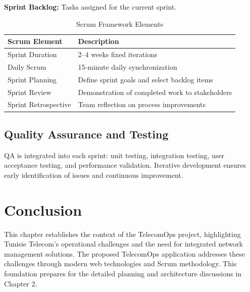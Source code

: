 \textbf{Sprint Backlog:} Tasks assigned for the current sprint.

\begin{table}[H]
\centering
\caption{Scrum Framework Elements}
\label{tab:scrum_elements}
\begin{tabular}{|l|p{9.5cm}|}
\hline
\textbf{Scrum Element} & \textbf{Description} \\ \hline
Sprint Duration & 2–4 weeks fixed iterations \\ \hline
Daily Scrum & 15-minute daily synchronization \\ \hline
Sprint Planning & Define sprint goals and select backlog items \\ \hline
Sprint Review & Demonstration of completed work to stakeholders \\ \hline
Sprint Retrospective & Team reflection on process improvements \\ \hline
\end{tabular}
\end{table}

\subsection{Quality Assurance and Testing}
QA is integrated into each sprint: unit testing, integration testing, user acceptance testing, and performance validation. Iterative development ensures early identification of issues and continuous improvement.

\section*{Conclusion}
This chapter establishes the context of the TelecomOps project, highlighting Tunisie Telecom's operational challenges and the need for integrated network management solutions. The proposed TelecomOps application addresses these challenges through modern web technologies and Scrum methodology. This foundation prepares for the detailed planning and architecture discussions in Chapter 2.
